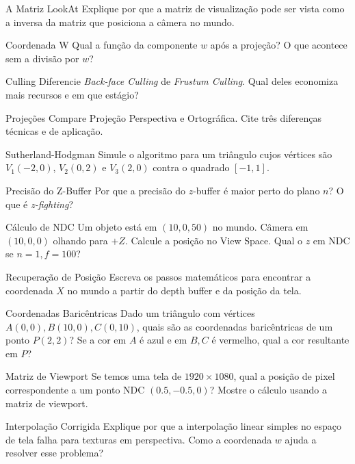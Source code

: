 \begin{exercicio}{A Matriz LookAt}
    Explique por que a matriz de visualização pode ser vista como a inversa da matriz que posiciona a câmera no mundo.
\end{exercicio}

\begin{exercicio}{Coordenada W}
    Qual a função da componente $w$ após a projeção? O que acontece sem a divisão por $w$?
\end{exercicio}

\begin{exercicio}{Culling}
    Diferencie \textit{Back-face Culling} de \textit{Frustum Culling}. Qual deles economiza mais recursos e em que estágio?
\end{exercicio}

\begin{exercicio}{Projeções}
    Compare Projeção Perspectiva e Ortográfica. Cite três diferenças técnicas e de aplicação.
\end{exercicio}

\begin{exercicio}{Sutherland-Hodgman}
    Simule o algoritmo para um triângulo cujos vértices são $V_1(-2, 0)$, $V_2(0, 2)$ e $V_3(2, 0)$ contra o quadrado $[-1, 1]$.
\end{exercicio}

\begin{exercicio}{Precisão do Z-Buffer}
    Por que a precisão do $z$-buffer é maior perto do plano $n$? O que é \textit{z-fighting}?
\end{exercicio}

\begin{exercicio}{Cálculo de NDC}
    Um objeto está em $(10, 0, 50)$ no mundo. Câmera em $(10, 0, 0)$ olhando para $+Z$. Calcule a posição no View Space. Qual o $z$ em NDC se $n=1, f=100$?
\end{exercicio}

\begin{exercicio}{Recuperação de Posição}
    Escreva os passos matemáticos para encontrar a coordenada $X$ no mundo a partir do depth buffer e da posição da tela.
\end{exercicio}

\begin{exercicio}{Coordenadas Baricêntricas}
    Dado um triângulo com vértices $A(0,0), B(10,0), C(0,10)$, quais são as coordenadas baricêntricas de um ponto $P(2,2)$? Se a cor em $A$ é azul e em $B, C$ é vermelho, qual a cor resultante em $P$?
\end{exercicio}

\begin{exercicio}{Matriz de Viewport}
    Se temos uma tela de $1920 \times 1080$, qual a posição de pixel correspondente a um ponto NDC $(0.5, -0.5, 0)$? Mostre o cálculo usando a matriz de viewport.
\end{exercicio}

\begin{exercicio}{Interpolação Corrigida}
    Explique por que a interpolação linear simples no espaço de tela falha para texturas em perspectiva. Como a coordenada $w$ ajuda a resolver esse problema?
\end{exercicio}
